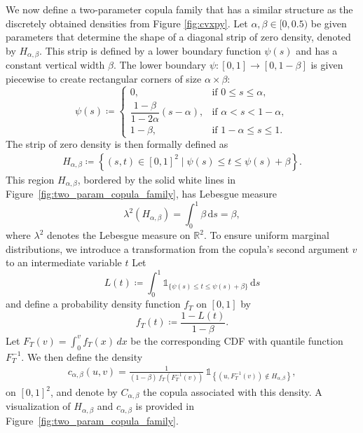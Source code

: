 \documentclass{article}
\newcommand{\1}{\mathds{1}}
\newcommand{\de}{\mathrm{\,d}}
\newcommand{\R}{\mathbb{R}}
\begin{document}
We now define a two-parameter copula family that has a similar structure as the discretely obtained densities from Figure \ref{fig:cvxpy}.
Let $\alpha, \beta \in [0, 0.5)$ be given parameters that determine the shape of a diagonal strip of zero density, denoted by $H_{\alpha,\beta}$.
This strip is defined by a lower boundary function $\psi(s)$ and has a constant vertical width $\beta$.
The lower boundary $\psi : [0,1] \to [0,1-\beta]$ is given piecewise to create rectangular corners of size $\alpha \times \beta$:
\[
    \psi(s) \coloneq
    \begin{cases}
        0, & \text{if } 0 \le s \le \alpha, \\[6pt]
        \dfrac{1-\beta}{1-2\alpha}(s - \alpha), & \text{if } \alpha < s < 1-\alpha, \\[10pt]
        1-\beta, & \text{if } 1-\alpha \le s \le 1.
    \end{cases}
\]
The strip of zero density is then formally defined as
\begin{align}\label{eq:zero_density_region}
    H_{\alpha,\beta}
    \coloneq \left\{ (s,t) \in [0,1]^2 \mid \psi(s) \le t \le \psi(s) + \beta \right\}.
\end{align}
This region $H_{\alpha,\beta}$, bordered by the solid white lines in Figure~\ref{fig:two_param_copula_family}, has Lebesgue measure
\[
    \lambda^2(H_{\alpha,\beta})
    = \int_0^1 \beta \de s
    = \beta,
\]
where $\lambda^2$ denotes the Lebesgue measure on $\R^2$.
To ensure uniform marginal distributions, we introduce a transformation from the copula’s second argument $v$ to an intermediate variable $t$ 
Let
\[
    L(t) \coloneq \int_0^1 \1_{\{\psi(s) \le t \le \psi(s) + \beta\}} \de s
\] 
and define a probability density function $f_T$ on $[0,1]$ by
\begin{equation}\label{eq:ft_density}
    f_T(t) \coloneq \frac{1 - L(t)}{1 - \beta}.
\end{equation}
Let $F_T(v) = \int_0^v f_T(x)\, dx$ be the corresponding CDF with quantile function $F_T^{-1}$.
We then define the density
\begin{align}\label{eq:two_param_copula_density}
    c_{\alpha,\beta}(u,v)
    = \frac{1}{(1 - \beta)\, f_T\left(F_T^{-1}(v)\right)}
      \, \1_{\left\{(u, F_T^{-1}(v)) \notin H_{\alpha,\beta}\right\}},
\end{align}
on $[0,1]^2$, and denote by $C_{\alpha,\beta}$ the copula associated with this density.
A visualization of $H_{\alpha,\beta}$ and $c_{\alpha,\beta}$ is provided in Figure~\ref{fig:two_param_copula_family}.
\end{document}

